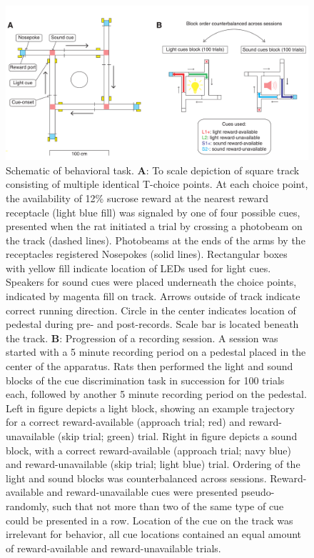 \documentclass[11pt]{article}
\newcommand{\bsf}[1]{\textbf{#1}}
\begin{document}
 \begin{figure}[ht!]
\centering
\includegraphics[width=\textwidth]{Fig 2 - Schematic task.pdf}
\caption{Schematic of behavioral task. \bsf{A}: To scale depiction of
  square track consisting of multiple identical T-choice points. At
  each choice point, the availability of 12\% sucrose reward at the
  nearest reward receptacle (light blue fill) was signaled by one of
  four possible cues, presented when the rat initiated a trial by
  crossing a photobeam on the track (dashed lines). Photobeams at the
  ends of the arms by the receptacles registered Nosepokes (solid
  lines). Rectangular boxes with yellow fill indicate location of LEDs
  used for light cues. Speakers for sound cues were placed underneath
  the choice points, indicated by magenta fill on track. Arrows
  outside of track indicate correct running direction. Circle in the
  center indicates location of pedestal during pre- and
  post-records. Scale bar is located beneath the track. \bsf{B}:
  Progression of a recording session. A session was started with a 5
  minute recording period on a pedestal placed in the center of the
  apparatus. Rats then performed the light and sound blocks of the cue
  discrimination task in succession for 100 trials each, followed by
  another 5 minute recording period on the pedestal. Left in figure
  depicts a light block, showing an example trajectory for a correct
  reward-available (approach trial; red) and reward-unavailable (skip
  trial; green) trial. Right in figure depicts a sound block, with a correct
  reward-available (approach trial; navy blue) and reward-unavailable
  (skip trial; light blue) trial. Ordering of the light and sound
  blocks was counterbalanced across sessions. Reward-available and
  reward-unavailable cues were presented pseudo-randomly, such that
  not more than two of the same type of cue could be presented in a
  row. Location of the cue on the track was irrelevant for behavior,
  all cue locations contained an equal amount of reward-available and
  reward-unavailable trials.}
\label{fig:task}
\end{figure} \clearpage
\end{document}
